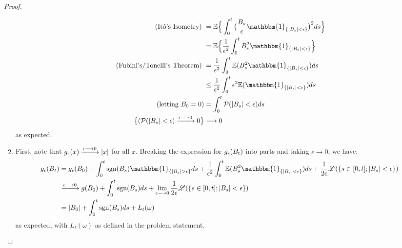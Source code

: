 \documentclass[11pt]{article}
\renewcommand{\P}{\mathbb{P}}
\newcommand{\go}{\omega}
\newcommand\abs[1]{\left|#1\right|}
\newcommand{\ind}[1]{\mathbbm{1}_{\{#1\}}}
\renewcommand{\to}{\longrightarrow}
\renewcommand{\P}{\mathcal{P}}
\newcommand{\E}{\mathbb{E}}
\newcommand{\geps}{\epsilon}
\DeclareMathOperator{\sgn}{sgn}
\begin{document}
\begin{proof}
\begin{enumerate}
\begin{align*}
\text{ (It\^o's Isometry) }&= \E \Big\{ \int_0^t \big( \frac{B_s}{\geps} \ind{\abs{B_s}<\geps} \big)^2 ds \Big\}\\
&= \E \Big\{ \frac{1}{\geps^2} \int_0^t B_s^2 \ind{\abs{B_s}<\geps} \Big\}\\
\text{ (Fubini's/Tonelli's Theorem) } &= \frac{1}{\geps^2} \int_0^t \E ( B_s^2 \ind{\abs{B_s}<\geps}) ds \\
&\leq \frac{1}{\geps^2}\int_0^t \geps^2 \E (\ind{\abs{B_s}<\geps}) ds \\
\text{(letting $B_0=0$)}&=  \int_0^t \P(\abs{B_s}<\geps) ds\\
\big\{(\P(\abs{B_s}<\geps) \xrightarrow{\geps \to 0} 0 \big\} &\to 0 
\end{align*}
as expected.
\item First, note that $\gtemp(x) \xrightarrow{\geps \to 0}  \abs{x}$ for all $x$.  Breaking the expression for $\gtemp (B_t)$ into parts and taking $\geps \to 0$, we have:
\begin{align*}
\gtemp(B_t) &= \gtemp(B_0) + \int_0^t \sgn(B_s) \ind{\abs{B_s}>\geps} ds + \frac{1}{\geps^2}\int_0^t \E (B_s^2 \ind{\abs{B_s}<\geps}) ds +\frac{1}{2 \geps} \mathscr{L}(\{s \in [0,t]; \abs{B_s}<\geps\})\\
& \xrightarrow{\geps \to 0} g(B_0) + \int_0^t \sgn(B_s) ds+ \lim_{\geps \to 0}\frac{1}{2 \geps} \mathscr{L}(\{s \in [0,t]; \abs{B_s}<\geps\})\\
&= \abs{B_0} +  \int_0^t \sgn(B_s) ds + L_t(\go)
\end{align*}
as expected, with $L_t(\go)$ as defined in the problem statement.
\end{enumerate}
\end{proof}
\end{document}
